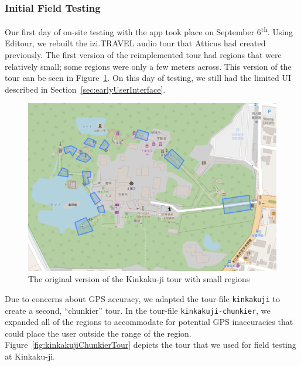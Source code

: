 \documentclass[a4paper, 10pt, american, titlepage]{article}
\begin{document}
\subsubsection{Initial Field Testing}
\label{sec:initialFieldTesting}

Our first day of on-site testing with the app took place on September
6\textsuperscript{th}. Using Editour, we rebuilt the izi.TRAVEL audio tour that
Atticus had created previously. The first version of the reimplemented tour had
regions that were relatively small; some regions were only a few meters across.
This version of the tour can be seen in Figure~\ref{fig:kinkakujiTour}. On this
day of testing, we still had the limited UI described in
Section~\ref{sec:earlyUserInterface}.

\begin{figure}[p]
	\centering
	\includegraphics[width=\textwidth]{kinkakuji-tour.png}
	\caption[The original version of the Kinkaku-ji tour]{The original version
		of the Kinkaku-ji tour with small regions}
	\label{fig:kinkakujiTour}
\end{figure}

Due to concerns about GPS accuracy, we adapted the tour-file \texttt{kinkakuji}
to create a second, ``chunkier'' tour.  In the tour-file
\texttt{kinkakuji-chunkier}, we expanded all of the regions to accommodate for
potential GPS inaccuracies that could place the user outside the range of the
region.  Figure~\ref{fig:kinkakujiChunkierTour} depicts the tour that we used
for field testing at Kinkaku-ji.
\end{document}
